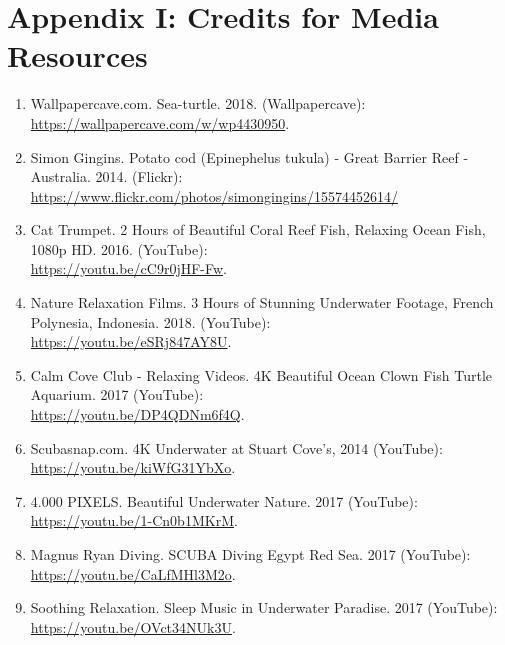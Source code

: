 \documentclass[10pt,twocolumn,letterpaper]{article}
\begin{document}
\section*{Appendix I: Credits for Media Resources}
{\small
\begin{enumerate}   


    \item Wallpapercave.com. Sea-turtle. 2018. (Wallpapercave):
    \url{https://wallpapercave.com/w/wp4430950}.
    


    


    








    \item Simon Gingins. Potato cod (Epinephelus tukula) - Great Barrier Reef - Australia. 2014. (Flickr):
    \url{https://www.flickr.com/photos/simongingins/15574452614/}
    
    \item Cat Trumpet. 2 Hours of Beautiful Coral Reef Fish, Relaxing Ocean Fish, 1080p HD. 2016. (YouTube): \\ \url{https://youtu.be/cC9r0jHF-Fw}.
    
    
    \item Nature Relaxation Films. 3 Hours of Stunning Underwater Footage, French Polynesia, Indonesia. 2018. (YouTube): \\
    \url{https://youtu.be/eSRj847AY8U}.
    
    
    \item Calm Cove Club - Relaxing Videos. 4K Beautiful Ocean Clown Fish Turtle Aquarium. 2017 (YouTube): \\ \url{https://youtu.be/DP4QDNm6f4Q}.
    
    \item Scubasnap.com. 4K Underwater at Stuart Cove's, 2014 (YouTube):  
    \url{https://youtu.be/kiWfG31YbXo}.
    
    
    \item 4.000 PIXELS. Beautiful Underwater Nature. 2017 (YouTube): \url{https://youtu.be/1-Cn0b1MKrM}.
    
    \item Magnus Ryan Diving. SCUBA Diving Egypt Red Sea. 2017 (YouTube):
    \url{https://youtu.be/CaLfMHl3M2o}.
    
    \item Soothing Relaxation. Sleep Music in Underwater Paradise. 2017 (YouTube): \url{https://youtu.be/OVct34NUk3U}.
    

\end{enumerate}}
\end{document}
